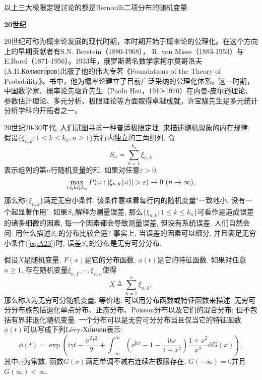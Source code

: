 以上三大极限定理讨论的都是Bernoulli二项分布的随机变量.

\textbf{20世纪}

20世纪可称为概率论发展的现代时期，本时期开始于概率论的公理化。在这个方向上的早期贡献者有S.N. Berstein（1880-1968）， R. von Mises（1883-1953）与E.Borel（1871-1956）。1933年，俄罗斯著名数学家柯尔莫哥洛夫(A.H.Колмого́ров)出版了他的伟大专著《Foundations of the Theory of Probability》。书中，他为概率论建立了目前广泛采纳的公理化体系。这一时期，中国数学家、概率论先驱许先生（Paolu Hsu，1910-1970）在内曼-皮尔逊理论、参数估计理论、多元分析、极限理论等方面取得卓越成就，许宝騄先生是多元统计分析学科的开拓者之一。

20世纪20-30年代, 人们试图寻求一种普适极限定理, 来描述随机现象的内在规律. 假设$\{\xi_{n,k};1\leqslant k\leqslant k_n,n\geqslant 1 \}$为行内独立的三角组列, 令
\begin{equation}\label{eq:A22}
S_n = \sum_{k=1}^{k_n}\xi_{n,k}
\end{equation}
表示组列的第$n$行随机变量的和. 如果对任意$\varepsilon>0$,
\begin{equation}\label{eq:A23}
\max_{1\leqslant k\leqslant k_n}P(\omega:\lvert\xi_{n,k}(\omega)\rvert>\varepsilon)\to 0~(n\to\infty),
\end{equation}
那么称$\{\xi_{n,k}\}$满足无穷小条件. 该条件意味着每行内的随机变量"一致地小, 没有一个起显著作用". 如果$S_n$解释为测量误差, 那么$\{\xi_{n,k};1\leqslant k\leqslant k_n\}$可看作是造成误差的诸多细微的因素, 每一个因素都会导致测量误差, 但没有系统误差. 人们自然会问: 用什么描述$S_n$的分布比较合适? 事实上, 当误差的因素可以细分, 并且满足无穷小条件(\ref{eq:A23})时, 误差$S_n$的分布是无穷可分分布.

假设$X$是随机变量, $F(x)$是它的分布函数, $\phi(t)$是它的特征函数. 如果对任意$n\geqslant 1$, 存在随机变量$\xi_{n,1},\cdots,\xi_{n,n}$使得
\begin{equation}\label{eq:A24}
X\triangleq \sum_{k = 1}^{n}\xi_{n,k},
\end{equation}
那么称$X$为无穷可分随机变量. 等价地, 可以用分布函数或特征函数来描述. 无穷可分分布族包括退化单点分布、正态分布、Poisson分布以及它们的混合分布; 但不包括有界非退化随机变量. 一个分布可以是无穷可分分布当且仅当它的特征函数$\phi(t)$可以写成下列Lévy-Хи́нчин表示:
\begin{equation}\label{eq:A25}
\phi(t)= \exp\left(\mathrm{i}\gamma t-\frac{\sigma^2t^2}{2}+\int_{-\infty}^{\infty}\left(\mathrm{e}^{\mathrm{i}tx}-1-\frac{\mathrm{i}tx}{1+x^2}\right)\frac{1+x^2}{x^2}\mathrm{d}G(x) \right),
\end{equation}
其中,$\gamma$为常数, 函数$G(x)$满足单调不减右连续左极限存在, $G(-\infty) = 0$并且$G(\infty)<\infty$.

